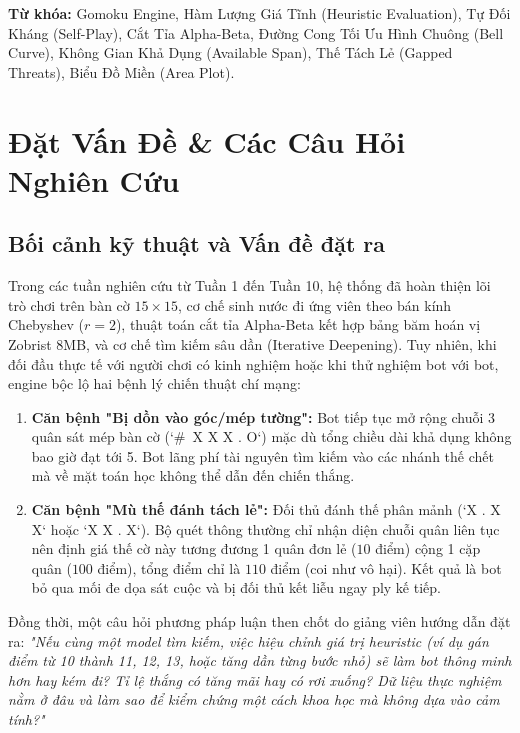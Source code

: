 \documentclass[11pt,a4paper]{article}
\begin{document}
\textbf{Từ khóa:} Gomoku Engine, Hàm Lượng Giá Tĩnh (Heuristic Evaluation), Tự Đối Kháng (Self-Play), Cắt Tỉa Alpha-Beta, Đường Cong Tối Ưu Hình Chuông (Bell Curve), Không Gian Khả Dụng (Available Span), Thế Tách Lẻ (Gapped Threats), Biểu Đồ Miền (Area Plot).

\vspace{6pt}

\section{Đặt Vấn Đề \& Các Câu Hỏi Nghiên Cứu}

\subsection{Bối cảnh kỹ thuật và Vấn đề đặt ra}
Trong các tuần nghiên cứu từ Tuần 1 đến Tuần 10, hệ thống đã hoàn thiện lõi trò chơi trên bàn cờ $15 \times 15$, cơ chế sinh nước đi ứng viên theo bán kính Chebyshev ($r=2$), thuật toán cắt tỉa Alpha-Beta kết hợp bảng băm hoán vị Zobrist 8MB, và cơ chế tìm kiếm sâu dần (Iterative Deepening). Tuy nhiên, khi đối đầu thực tế với người chơi có kinh nghiệm hoặc khi thử nghiệm bot với bot, engine bộc lộ hai bệnh lý chiến thuật chí mạng:
\begin{enumerate}
    \item \textbf{Căn bệnh "Bị dồn vào góc/mép tường":} Bot tiếp tục mở rộng chuỗi 3 quân sát mép bàn cờ (`\#\ X X X . O`) mặc dù tổng chiều dài khả dụng không bao giờ đạt tới 5. Bot lãng phí tài nguyên tìm kiếm vào các nhánh thế chết mà về mặt toán học không thể dẫn đến chiến thắng.
    \item \textbf{Căn bệnh "Mù thế đánh tách lẻ":} Đối thủ đánh thế phân mảnh (`X . X X` hoặc `X X . X`). Bộ quét thông thường chỉ nhận diện chuỗi quân liên tục nên định giá thế cờ này tương đương 1 quân đơn lẻ ($10$ điểm) cộng 1 cặp quân ($100$ điểm), tổng điểm chỉ là $110$ điểm (coi như vô hại). Kết quả là bot bỏ qua mối đe dọa sát cuộc và bị đối thủ kết liễu ngay ply kế tiếp.
\end{enumerate}

Đồng thời, một câu hỏi phương pháp luận then chốt do giảng viên hướng dẫn đặt ra: \textit{"Nếu cùng một model tìm kiếm, việc hiệu chỉnh giá trị heuristic (ví dụ gán điểm từ 10 thành 11, 12, 13, hoặc tăng dần từng bước nhỏ) sẽ làm bot thông minh hơn hay kém đi? Tỉ lệ thắng có tăng mãi hay có rơi xuống? Dữ liệu thực nghiệm nằm ở đâu và làm sao để kiểm chứng một cách khoa học mà không dựa vào cảm tính?"}
\end{document}
